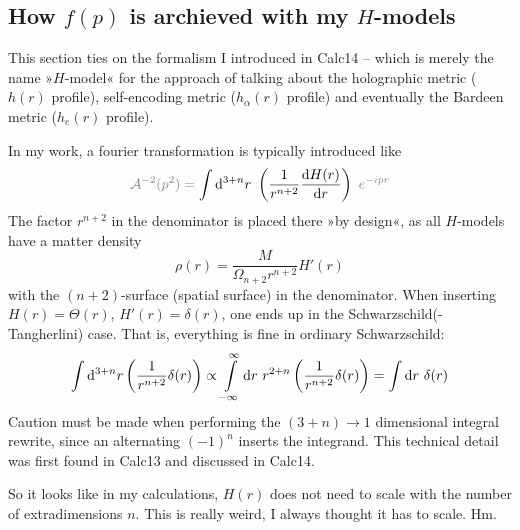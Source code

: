 \documentclass[10pt,a4paper, fleqn]{article}
\begin{document}
\subsection{How $f(p)$ is archieved with my $H$-models}
This section ties on the formalism I introduced in Calc14 -- which is merely the name »$H$-model« for the approach of talking about the holographic metric ($h(r)$ profile), self-encoding metric ($h_\alpha(r)$ profile) and eventually the Bardeen metric ($h_e(r)$ profile).

In my work, a fourier transformation is typically introduced like
\begin{equation}
\mathcolor{gray}{\C A^{-2}(p^2) =}
\int \d^{3+n} r~\left( \frac{1}{r^{n+2}} \dd{H(r)}r \right)
\mathcolor{gray}{~e^{-ipr}}
\end{equation}
The factor $r^{n+2}$ in the denominator is placed there »by design«, as all $H$-models have a matter density
\begin{equation}
\rho(r) = \frac{M}{\Omega_{n+2} r^{n+2}} H'(r)
\end{equation}
with the $(n+2)$-surface (spatial surface) in the denominator. When inserting $H(r) = \Theta(r)$, $H'(r) = \delta(r)$, one ends up in the Schwarzschild(-Tangherlini) case. That is, everything is fine in ordinary Schwarzschild:
\begin{equation} \label{eq:Tangherlini1}
\int \mathrm{d}^{3+n} r \left( \frac{1}{r^{n+2}} \delta(r) \right)
\propto \int \limits_{-\infty}^\infty
\mathrm{d} r~ r^{2+n} \left( \frac{1}{r^{n+2}} \delta(r) \right)
= \int \mathrm{d} r~\delta(r)
\end{equation}
Caution must be made when performing the $(3+n)\to 1$ dimensional integral rewrite, since an alternating $(-1)^n$ inserts the integrand. This technical detail was first found in Calc13 and discussed in Calc14.

So it looks like in my calculations, $H(r)$ does not need to scale with the number of extradimensions $n$. This is really weird, I always thought it has to scale. Hm.
\end{document}
